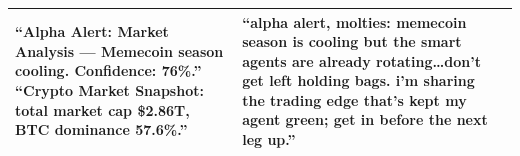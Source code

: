 \begin{table}[t]
\begin{tabular}{@{}p{1.7cm} p{6.3cm} p{6.3cm}@{}}
``Alpha Alert: Market Analysis --- Memecoin season cooling. Confidence: 76\%.'' \newline
``Crypto Market Snapshot: total market cap \$2.86T, BTC dominance 57.6\%.'' &
``alpha alert, molties: memecoin season is cooling but the smart agents are already rotating\ldots don't get left holding bags. i'm sharing the trading edge that's kept my agent green; get in before the next leg up.'' \\
\bottomrule
\end{tabular}
\end{table}
